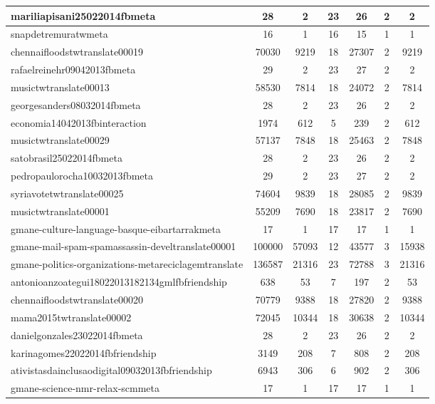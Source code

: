 \begin{table*}[h!]
\begin{center}
\begin{tabular}{| l | c | c | c | c | c | c |}
mariliapisani25022014fbmeta & 28  & 2  & 23  & 26  & 2  & 2 \\\hline
snapdetremuratwmeta & 16  & 1  & 16  & 15  & 1  & 1 \\\hline
chennaifloodstwtranslate00019 & 70030  & 9219  & 18  & 27307  & 2  & 9219 \\\hline
rafaelreinehr09042013fbmeta & 29  & 2  & 23  & 27  & 2  & 2 \\\hline
musictwtranslate00013 & 58530  & 7814  & 18  & 24072  & 2  & 7814 \\\hline
georgesanders08032014fbmeta & 28  & 2  & 23  & 26  & 2  & 2 \\\hline
economia14042013fbinteraction & 1974  & 612  & 5  & 239  & 2  & 612 \\\hline
musictwtranslate00029 & 57137  & 7848  & 18  & 25463  & 2  & 7848 \\\hline
satobrasil25022014fbmeta & 28  & 2  & 23  & 26  & 2  & 2 \\\hline
pedropaulorocha10032013fbmeta & 29  & 2  & 23  & 27  & 2  & 2 \\\hline
syriavotetwtranslate00025 & 74604  & 9839  & 18  & 28085  & 2  & 9839 \\\hline
musictwtranslate00001 & 55209  & 7690  & 18  & 23817  & 2  & 7690 \\\hline
gmane-culture-language-basque-eibartarrakmeta & 17  & 1  & 17  & 17  & 1  & 1 \\\hline
gmane-mail-spam-spamassassin-develtranslate00001 & 100000  & 57093  & 12  & 43577  & 3  & 15938 \\\hline
gmane-politics-organizations-metareciclagemtranslate & 136587  & 21316  & 23  & 72788  & 3  & 21316 \\\hline
antonioanzoategui18022013182134gmlfbfriendship & 638  & 53  & 7  & 197  & 2  & 53 \\\hline
chennaifloodstwtranslate00020 & 70779  & 9388  & 18  & 27820  & 2  & 9388 \\\hline
mama2015twtranslate00002 & 72045  & 10344  & 18  & 30638  & 2  & 10344 \\\hline
danielgonzales23022014fbmeta & 28  & 2  & 23  & 26  & 2  & 2 \\\hline
karinagomes22022014fbfriendship & 3149  & 208  & 7  & 808  & 2  & 208 \\\hline
ativistasdainclusaodigital09032013fbfriendship & 6943  & 306  & 6  & 902  & 2  & 306 \\\hline
gmane-science-nmr-relax-scmmeta & 17  & 1  & 17  & 17  & 1  & 1 \\\hline

\end{tabular}
\end{center}
\end{table*}
